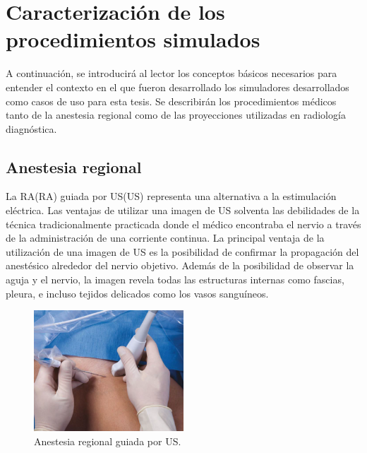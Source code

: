 \section{Caracterización de los procedimientos simulados}

A continuación, se introducirá al lector los conceptos básicos necesarios para entender el contexto en el que fueron desarrollado los simuladores desarrollados como casos de uso para esta tesis. Se describirán los procedimientos médicos tanto de la anestesia regional como de las proyecciones utilizadas en radiología diagnóstica.

\subsection{Anestesia regional}
\label{art:ra}


La \acl{RA}(\acs{RA}) guiada por \acl{US}(\acs{US}) representa una alternativa a la estimulación eléctrica. Las ventajas de utilizar una imagen de \ac{US} solventa las debilidades de la técnica tradicionalmente practicada donde el médico encontraba el nervio a través de la administración de una corriente continua. La principal ventaja de la utilización de una imagen de \ac{US} es la posibilidad de confirmar la propagación del anestésico alrededor del nervio objetivo. Además de la posibilidad de observar la aguja y el nervio, la imagen revela todas las estructuras internas como fascias, pleura, e incluso tejidos delicados como los vasos sanguíneos. 

\begin{figure}[h]
   \centering
    \includegraphics[width=0.5\textwidth]{IMG/RAUS.png}
    \caption{ Anestesia regional guiada por \acl{US}.}
   \label{fig:raus}
\end{figure}

